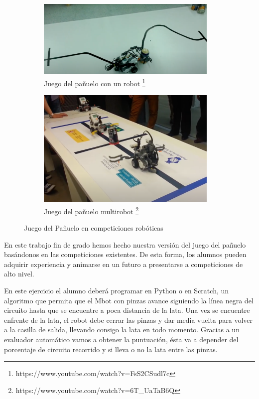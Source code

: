 \begin{figure}[H]
  \begin{subfigure}[b]{0.5\textwidth}
  \centering
    \includegraphics[width=0.95\textwidth, height=0.4\textwidth]{chapters/images/jp.png}
    \caption{Juego del pañuelo con un robot \footnote{https://www.youtube.com/watch?v=FsS2CSudl7c}}
    \label{fig:f1}
  \end{subfigure}
  \hfill
  \begin{subfigure}[b]{0.5\textwidth}
  \centering
    \includegraphics[width=0.95\textwidth, height=0.4\textwidth]{chapters/images/jp2.png}
    \caption{Juego del pañuelo multirobot \footnote{https://www.youtube.com/watch?v=6T\_Ua\-TaB6Q}}
    \label{fig:f2}
  \end{subfigure}
  \caption{Juego del Pañuelo en competiciones robóticas}

\end{figure}

En este trabajo fin de grado hemos hecho nuestra versión del juego del pañuelo basándonos en las competiciones existentes. De esta forma, los alumnos pueden adquirir experiencia y animarse en un futuro a presentarse a competiciones de alto nivel.
 
En este ejercicio el alumno deberá programar en Python o en Scratch, un algoritmo que permita que el Mbot con pinzas avance siguiendo la línea negra del circuito hasta que se encuentre a poca distancia de la lata. Una vez se encuentre enfrente de la lata, el robot debe cerrar las pinzas y dar media vuelta para volver a la casilla de salida, llevando consigo la lata en todo momento. Gracias a un evaluador automático vamos a obtener la puntuación, ésta va a depender del porcentaje de circuito recorrido y si lleva o no la lata entre las pinzas.


